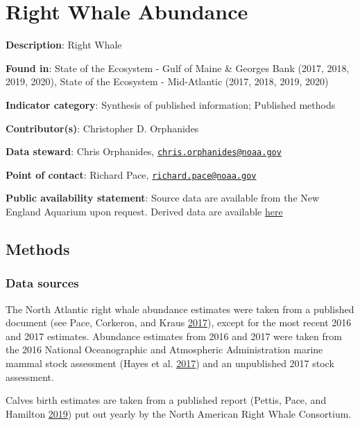 \documentclass[
]{book}
\begin{document}
\hypertarget{right-whale-abundance}{%
\chapter{Right Whale Abundance}\label{right-whale-abundance}}

\textbf{Description}: Right Whale

\textbf{Found in}: State of the Ecosystem - Gulf of Maine \& Georges Bank (2017, 2018, 2019, 2020), State of the Ecosystem - Mid-Atlantic (2017, 2018, 2019, 2020)

\textbf{Indicator category}: Synthesis of published information; Published methods

\textbf{Contributor(s)}: Christopher D. Orphanides

\textbf{Data steward}: Chris Orphanides, \href{mailto:chris.orphanides@noaa.gov}{\nolinkurl{chris.orphanides@noaa.gov}}

\textbf{Point of contact}: Richard Pace, \href{mailto:richard.pace@noaa.gov}{\nolinkurl{richard.pace@noaa.gov}}

\textbf{Public availability statement}: Source data are available from the New England Aquarium upon request. Derived data are available \href{http://comet.nefsc.noaa.gov/erddap/tabledap/protected_species_soe_v1.html}{here}

\hypertarget{methods-30}{%
\section{Methods}\label{methods-30}}

\hypertarget{data-sources-30}{%
\subsection{Data sources}\label{data-sources-30}}

The North Atlantic right whale abundance estimates were taken from a published document (see Pace, Corkeron, and Kraus \protect\hyperlink{ref-Pace2017}{2017}), except for the most recent 2016 and 2017 estimates. Abundance estimates from 2016 and 2017 were taken from the 2016 National Oceanographic and Atmospheric Administration marine mammal stock assessment (Hayes et al. \protect\hyperlink{ref-Hayes2017}{2017}) and an unpublished 2017 stock assessment.

Calves birth estimates are taken from a published report (Pettis, Pace, and Hamilton \protect\hyperlink{ref-narw2019}{2019}) put out yearly by the North American Right Whale Consortium.
\end{document}
